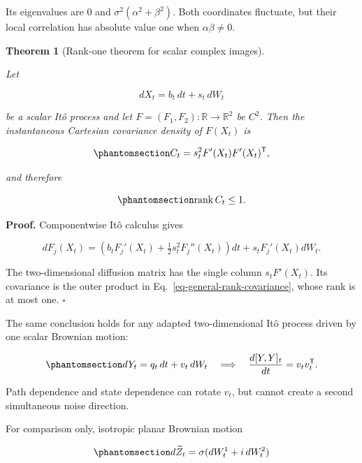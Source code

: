 \documentclass[
  english,
  10pt,
  letterpaper,
  DIV=11,
  numbers=noendperiod]{scrartcl}
\theoremstyle{plain}
\newtheorem{theorem}{Theorem}[section]
\theoremstyle{remark}
\begin{document}
Its eigenvalues are \(0\) and \(\sigma^2(\alpha^2+\beta^2)\). Both
coordinates fluctuate, but their local correlation has absolute value
one when \(\alpha\beta\ne0\).

\begin{theorem}[Rank-one theorem for scalar complex
images]\protect\hypertarget{thm-rank}{}\label{thm-rank}

Let

\[
dX_t=b_t\,dt+s_t\,dW_t
\]

be a scalar Itô process and let \(F=(F_1,F_2):\mathbb R\to\mathbb R^2\)
be \(C^2\). Then the instantaneous Cartesian covariance density of
\(F(X_t)\) is

\begin{equation}\protect\phantomsection\label{eq-general-rank-covariance}{
C_t=s_t^2F'(X_t)F'(X_t)^\mathsf T,
}\end{equation}

and therefore

\begin{equation}\protect\phantomsection\label{eq-rank-bound}{
\operatorname{rank}C_t\le1.
}\end{equation}

\end{theorem}

\textbf{Proof.} Componentwise Itô calculus gives

\[
dF_j(X_t)
=\left(b_tF_j'(X_t)+\tfrac12s_t^2F_j''(X_t)\right)dt
+s_tF_j'(X_t)dW_t.
\]

The two-dimensional diffusion matrix has the single column
\(s_tF'(X_t)\). Its covariance is the outer product in
Eq.~\ref{eq-general-rank-covariance}, whose rank is at most one.
\(\square\)

The same conclusion holds for any adapted two-dimensional Itô process
driven by one scalar Brownian motion:

\begin{equation}\protect\phantomsection\label{eq-stronger-rank}{
dY_t=q_t\,dt+v_t\,dW_t
\quad\Longrightarrow\quad
\frac{d[Y,Y]_t}{dt}=v_tv_t^\mathsf T.
}\end{equation}

Path dependence and state dependence can rotate \(v_t\), but cannot
create a second simultaneous noise direction.

For comparison only, isotropic planar Brownian motion

\begin{equation}\protect\phantomsection\label{eq-planar-control}{
d\widetilde Z_t=\sigma(dW_t^1+i\,dW_t^2)
}\end{equation}
\end{document}
